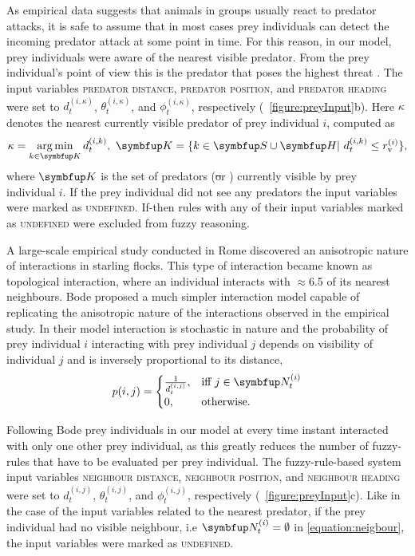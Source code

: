 As empirical data suggests that animals in groups usually react to predator attacks\cite{partridge1982structure,pitcher1983predator}, it is safe to assume that in most cases prey individuals can detect the incoming predator attack at some point in time. For this reason, in our model, prey individuals were aware of the nearest visible predator. From the prey individual's point of view this is the predator that poses the highest threat \cite{rieucau2014experimental}. The input variables \textsc{predator distance}, \textsc{predator position}, and \textsc{predator heading} were set to $d^{(i,\kappa)}_t$, $\theta^{(i,\kappa)}_t$, and $\phi^{(i,\kappa)}_t$, respectively (\figurename~\ref{figure:preyInput}b). Here $\kappa$ denotes the nearest currently visible predator of prey individual $i$, computed as
%
\begin{equation}
\kappa = \argmin_{k \in \set{K}} d^{(i,k)}_t,\ \set{K}=\{k \in \set{S} \cup \set{H}|\ d^{(i,k)}_t \leq r^{(i)}_\textnormal{v}\}, 
\end{equation}
%
where $\set{K}$ is the set of predators (\st or \hdaa) currently visible by prey individual $i$. If the prey individual did not see any predators the input variables were marked as \textsc{undefined}. If-then rules with any of their input variables marked as \textsc{undefined} were excluded from fuzzy reasoning.

A large-scale empirical study conducted in Rome \cite{ballerini2008interaction} discovered an anisotropic nature of interactions in starling flocks. This type of interaction became known as topological interaction, where an individual interacts with $\approx$\num{6.5} of its nearest neighbours. Bode\etal \cite{bode2010perceived} proposed a much simpler interaction model capable of replicating the anisotropic nature of the interactions observed in the empirical study. In their model interaction is stochastic in nature and the probability of prey individual $i$ interacting with prey individual $j$ depends on visibility of individual $j$ and is inversely proportional to its distance,
%
\begin{equation}
p(i,j) = 
	\begin{cases}
		\frac{1}{d^{(i,j)}_t}, &\text{iff }j \in \set{N}^{(i)}_t\\
		0, &\text{otherwise}.
    \end{cases}
\label{equation:neigbour}
\end{equation}

Following Bode\etal \cite{bode2010perceived} prey individuals in our model at every time instant interacted with only one other prey individual, as this greatly reduces the number of fuzzy-rules that have to be evaluated per prey individual. The fuzzy-rule-based system input variables \textsc{neighbour distance}, \textsc{neighbour position}, and \textsc{neighbour heading} were set to $d^{(i,j)}_t$, $\theta^{(i,j)}_t$, and $\phi^{(i,j)}_t$, respectively (\figurename~\ref{figure:preyInput}c). Like in the case of the input variables related to the nearest predator, if the prey individual had no visible neighbour, i.e $\set{N}^{(i)}_t = \emptyset$ in \eq \eqref{equation:neigbour}, the input variables were marked as \textsc{undefined}.

